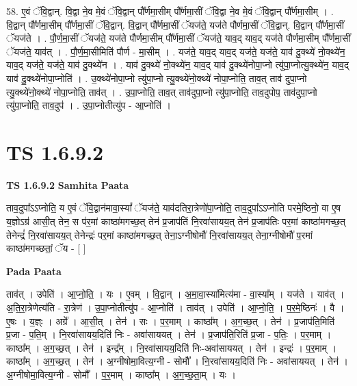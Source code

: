 \documentclass[17pt]{extarticle}
\begin{document}
58. ए॒वं ॅवि॒द्वान्. वि॒द्वा ने॒व मे॒वं ॅवि॒द्वान् पौ᳚र्णमा॒सीम् पौ᳚र्णमा॒सीं ॅवि॒द्वा ने॒व मे॒वं ॅवि॒द्वान् पौ᳚र्णमा॒सीम् । . वि॒द्वान् पौ᳚र्णमा॒सीम् पौ᳚र्णमा॒सीं ॅवि॒द्वान्. वि॒द्वान् पौ᳚र्णमा॒सीं ॅयज॑ते॒ यज॑ते पौर्णमा॒सीं ॅवि॒द्वान्. वि॒द्वान् पौ᳚र्णमा॒सीं ॅयज॑ते । . पौ॒र्ण॒मा॒सीं ॅयज॑ते॒ यज॑ते पौर्णमा॒सीम् पौ᳚र्णमा॒सीं ॅयज॑ते॒ याव॒द् याव॒द् यज॑ते पौर्णमा॒सीम् पौ᳚र्णमा॒सीं ॅयज॑ते॒ याव॑त् । . पौ॒र्ण॒मा॒सीमिति॑ पौर्ण - मा॒सीम् । . यज॑ते॒ याव॒द् याव॒द् यज॑ते॒ यज॑ते॒ याव॑ दु॒क्थ्ये॑ नो॒क्थ्ये॑न॒ याव॒द् यज॑ते॒ यज॑ते॒ याव॑ दु॒क्थ्ये॑न । . याव॑ दु॒क्थ्ये॑ नो॒क्थ्ये॑न॒ याव॒द् याव॑ दु॒क्थ्ये॑नोपा॒प्नो त्यु॑पा॒प्नोत्यु॒क्थ्ये॑न॒ याव॒द् याव॑ दु॒क्थ्ये॑नोपा॒प्नोति॑ । . उ॒क्थ्ये॑नोपा॒प्नो त्यु॑पा॒प्नो त्यु॒क्थ्ये॑नो॒क्थ्ये॑ नोपा॒प्नोति॒ ताव॒त् ताव॑ दुपा॒प्नो त्यु॒क्थ्ये॑नो॒क्थ्ये॑ नोपा॒प्नोति॒ ताव॑त् । . उ॒पा॒प्नोति॒ ताव॒त् ताव॑दुपा॒प्नो त्यु॑पा॒प्नोति॒ ताव॒दुपोप॒ ताव॑दुपा॒प्नो त्यु॑पा॒प्नोति॒ ताव॒दुप॑ । . उ॒पा॒प्नोतीत्यु॑प - आ॒प्नोति॑ । \newline
\pagebreak
{}

\section{ TS 1.6.9.2 }

\textbf{TS 1.6.9.2 } \newline
\textbf{Samhita Paata} \newline

ताव॒दुपा᳚ऽऽप्नोति॒ य ए॒वं ॅवि॒द्वान॑मावा॒स्यां᳚ ॅयज॑ते॒ याव॑दतिरा॒त्रेणो॑पा॒प्नोति॒ ताव॒दुपा᳚ऽऽप्नोति परमे॒ष्ठिनो॒ वा ए॒ष य॒ज्ञोऽग्र॑ आसी॒त् तेन॒ स प॑र॒मां काष्ठा॑मगच्छ॒त् तेन॑ प्र॒जाप॑तिं नि॒रवा॑सायय॒त् तेन॑ प्र॒जाप॑तिः पर॒मां काष्ठा॑मगच्छ॒त् तेनेन्द्रं॑ नि॒रवा॑सायय॒त् तेनेन्द्रः॑ पर॒मां काष्ठा॑मगच्छ॒त् तेना॒ऽग्नीषोमौ॑ नि॒रवा॑सायय॒त् तेना॒ग्नीषोमौ॑ प॒रमां काष्ठा॑मगच्छतां॒ ॅय - [ ] \newline

\textbf{Pada Paata} \newline

ताव॑त् । उपेति॑ । आ॒प्नो॒ति॒ । यः । ए॒वम् । वि॒द्वान् । अ॒मा॒वा॒स्या॑मित्य॑मा - वा॒स्या᳚म् । यज॑ते । याव॑त् । अ॒ति॒रा॒त्रेणेत्य॑ति - रा॒त्रेण॑ । उ॒पा॒प्नोतीत्यु॑प - आ॒प्नोति॑ । ताव॑त् । उपेति॑ । आ॒प्नो॒ति॒ । प॒र॒मे॒ष्ठिनः॑ । वै । ए॒षः । य॒ज्ञ्ः । अग्रे᳚ । आ॒सी॒त् । तेन॑ । सः । प॒र॒माम् । काष्ठा᳚म् । अ॒ग॒च्छ॒त् । तेन॑ । प्र॒जाप॑ति॒मिति॑ प्र॒जा - प॒ति॒म् । नि॒रवा॑सायय॒दिति॑ निः - अवा॑साययत् । तेन॑ । प्र॒जाप॑ति॒रिति॑ प्र॒जा - प॒तिः॒ । प॒र॒माम् । काष्ठा᳚म् । अ॒ग॒च्छ॒त् । तेन॑ । इन्द्र᳚म् । नि॒रवा॑सायय॒दिति॑ निः-अवा॑साययत् । तेन॑ । इन्द्रः॑ । प॒र॒माम् । काष्ठा᳚म् । अ॒ग॒च्छ॒त् । तेन॑ । अ॒ग्नीषोमा॒वित्य॒ग्नी - सोमौ᳚ । नि॒रवा॑सायय॒दिति॑ निः - अवा॑साययत् । तेन॑ । अ॒ग्नीषोमा॒वित्य॒ग्नी - सोमौ᳚ । प॒र॒माम् । काष्ठा᳚म् । अ॒ग॒च्छ॒ता॒म् । यः ।  \newline
\end{document}
